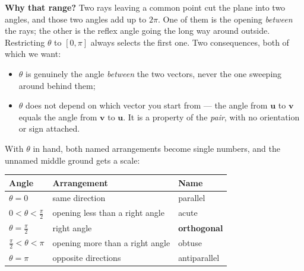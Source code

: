 \documentclass[11pt]{article}
\theoremstyle{definition}
\theoremstyle{remark}
\newcommand{\vc}[1]{\mathbf{#1}}
\newcommand{\lattice}[4]{%
  \draw[step=1cm,gray!25,very thin] (#1,#3) grid (#2,#4);
  \draw[axisline] (#1,0) -- (#2+0.45,0) node[right,font=\scriptsize,black]{$x$};
  \draw[axisline] (0,#3) -- (0,#4+0.45) node[above,font=\scriptsize,black]{$y$};
}
\begin{document}
\begin{center}
\end{center}

\noindent \textbf{Why that range?} Two rays leaving a common point cut the plane
into two angles, and those two angles add up to $2\pi$. One of them is the
opening \emph{between} the rays; the other is the reflex angle going the long way
around outside. Restricting $\theta$ to $[0,\pi]$ always selects the first one.
Two consequences, both of which we want:

\begin{itemize}[leftmargin=1.4em,itemsep=3pt]
  \item $\theta$ is genuinely the angle \emph{between} the two vectors, never the
        one sweeping around behind them;
  \item $\theta$ does not depend on which vector you start from --- the angle
        from $\vc{u}$ to $\vc{v}$ equals the angle from $\vc{v}$ to $\vc{u}$. It
        is a property of the \emph{pair}, with no orientation or sign attached.
\end{itemize}

\noindent With $\theta$ in hand, both named arrangements become single numbers,
and the unnamed middle ground gets a scale:

\begin{center}
\renewcommand{\arraystretch}{1.3}
\begin{tabular}{@{}l l l@{}}
\toprule
\textbf{Angle} & \textbf{Arrangement} & \textbf{Name} \\
\midrule
$\theta=0$                  & same direction                & parallel \\
$0<\theta<\tfrac{\pi}{2}$   & opening less than a right angle & acute \\
$\theta=\tfrac{\pi}{2}$     & right angle                   & \textbf{orthogonal} \\
$\tfrac{\pi}{2}<\theta<\pi$ & opening more than a right angle & obtuse \\
$\theta=\pi$                & opposite directions           & antiparallel \\
\bottomrule
\end{tabular}
\end{center}
\end{document}
